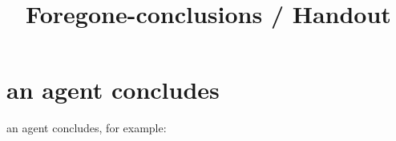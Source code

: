 \documentclass[10pt]{article}
\title{
  Foregone-conclusions \quad / \quad Handout
}
\date{ }
\begin{document}
\maketitle


\section{ an agent concludes}
\label{sec:overview}

\begin{note}
   an agent concludes, for example:
\end{note}
\end{document}
